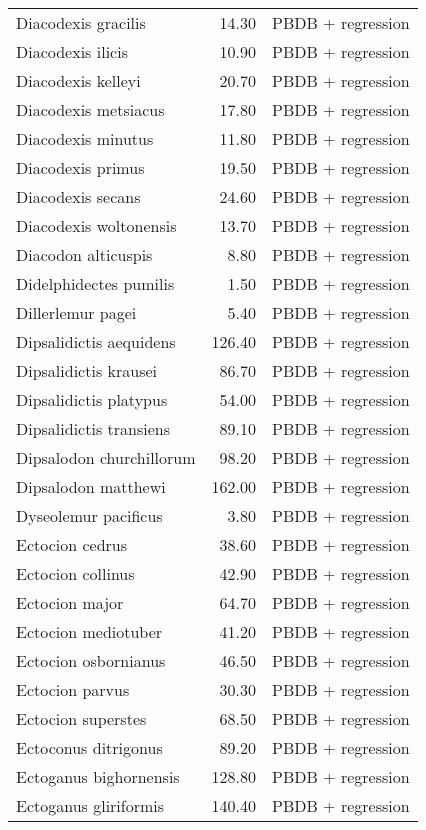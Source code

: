 \begin{table}[ht]
\begin{tabular}{lrl}
  Diacodexis gracilis & 14.30 & PBDB + regression \\ 
  Diacodexis ilicis & 10.90 & PBDB + regression \\ 
  Diacodexis kelleyi & 20.70 & PBDB + regression \\ 
  Diacodexis metsiacus & 17.80 & PBDB + regression \\ 
  Diacodexis minutus & 11.80 & PBDB + regression \\ 
  Diacodexis primus & 19.50 & PBDB + regression \\ 
  Diacodexis secans & 24.60 & PBDB + regression \\ 
  Diacodexis woltonensis & 13.70 & PBDB + regression \\ 
  Diacodon alticuspis & 8.80 & PBDB + regression \\ 
  Didelphidectes pumilis & 1.50 & PBDB + regression \\ 
  Dillerlemur pagei & 5.40 & PBDB + regression \\ 
  Dipsalidictis aequidens & 126.40 & PBDB + regression \\ 
  Dipsalidictis krausei & 86.70 & PBDB + regression \\ 
  Dipsalidictis platypus & 54.00 & PBDB + regression \\ 
  Dipsalidictis transiens & 89.10 & PBDB + regression \\ 
  Dipsalodon churchillorum & 98.20 & PBDB + regression \\ 
  Dipsalodon matthewi & 162.00 & PBDB + regression \\ 
  Dyseolemur pacificus & 3.80 & PBDB + regression \\ 
  Ectocion cedrus & 38.60 & PBDB + regression \\ 
  Ectocion collinus & 42.90 & PBDB + regression \\ 
  Ectocion major & 64.70 & PBDB + regression \\ 
  Ectocion mediotuber & 41.20 & PBDB + regression \\ 
  Ectocion osbornianus & 46.50 & PBDB + regression \\ 
  Ectocion parvus & 30.30 & PBDB + regression \\ 
  Ectocion superstes & 68.50 & PBDB + regression \\ 
  Ectoconus ditrigonus & 89.20 & PBDB + regression \\ 
  Ectoganus bighornensis & 128.80 & PBDB + regression \\ 
  Ectoganus gliriformis & 140.40 & PBDB + regression \\ 

\end{tabular}
\end{table}
